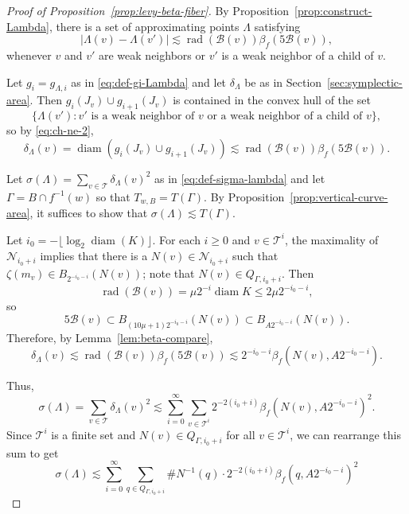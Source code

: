 \documentclass[12pt,reqno]{amsart}
\newcommand{\cB}{\mathcal{B}}
\newcommand{\cN}{\mathcal{N}}
\newcommand{\cT}{\mathcal{T}}
\DeclareMathOperator{\rad}{rad}
\theoremstyle{remark}
\newcommand{\0}{\mathbf{0}}
\renewcommand{\1}{\mathbf 1}
\DeclareMathOperator{\diam}{diam}
\begin{document}
\begin{proof}[Proof of Proposition~\ref{prop:levy-beta-fiber}]
  By Proposition~\ref{prop:construct-Lambda}, there is a set of approximating points $\Lambda$ satisfying
  \begin{equation}\label{eq:ch-ne-2}
    |\Lambda(v) - \Lambda(v')| \lesssim \rad(\cB(v)) \beta_f(5 \cB(v)),
  \end{equation}
  whenever $v$ and $v'$ are weak neighbors or $v'$ is a weak neighbor of a child of $v$.

  Let $g_i = g_{\Lambda,i}$ as in \eqref{eq:def-gi-Lambda} and let $\delta_\Lambda$ be as in Section~\ref{sec:symplectic-area}. Then $g_{i}(J_v) \cup g_{i+1}(J_v)$ is contained in the convex hull of the set
  $$\{\Lambda(v') : \text{$v'$ is a weak neighbor of $v$ or a weak neighbor of a child of $v$}\},$$
  so by \eqref{eq:ch-ne-2}, 
  $$\delta_\Lambda(v) = \diam\left(g_{i}(J_v) \cup g_{i+1}(J_v)\right) \lesssim \rad(\cB(v)) \beta_f(5 \cB(v)).$$

  Let $\sigma(\Lambda) = \sum_{v\in \cT} \delta_\Lambda(v)^2$ as in \eqref{eq:def-sigma-lambda} and let $\Gamma = B\cap f^{-1}(w)$ so that $T_{w,B}=T(\Gamma)$.
  By Proposition~\ref{prop:vertical-curve-area}, it suffices to show that $\sigma(\Lambda) \lesssim T(\Gamma)$.

  Let $i_0 = -\lfloor \log_2\diam(K)\rfloor$. For each $i\ge 0$ and $v\in \cT^i$, the maximality of $\cN_{i_0 + i}$ implies that there is a $N(v)\in \cN_{i_0+i}$ such that $\zeta(m_v) \in B_{2^{-i_0 - i}}(N(v))$; note that $N(v) \in Q_{\Gamma, i_0 + i}$. 
  Then 
  $$\rad(\cB(v)) = \mu 2^{-i}\diam K \le 2 \mu 2^{-i_0 - i},$$
  so
  \begin{equation}\label{eq:5cbv}
    5\cB(v) \subset B_{(10\mu + 1)2^{-i_0 - i}}(N(v)) \subset B_{A 2^{-i_0 - i}}(N(v)).
  \end{equation}
  Therefore, by Lemma~\ref{lem:beta-compare},
  $$\delta_\Lambda(v)\lesssim \rad(\cB(v)) \beta_f(5 \cB(v)) \lesssim 2^{-i_0 - i} \beta_f(N(v), A 2^{-i_0 - i}).$$
  
  Thus,
  $$
  \sigma(\Lambda) = \sum_{v\in \cT} \delta_\Lambda(v)^2 \lesssim \sum_{i=0}^\infty \sum_{v\in \cT^i} 2^{-2(i_0 + i)} \beta_f(N(v), A 2^{-i_0 - i})^2.
  $$
  Since $\cT^i$ is a finite set and $N(v) \in Q_{\Gamma, i_0 + i}$ for all $v\in \cT^i$, we can rearrange this sum to get
  \begin{equation}\label{eq:sigma-lambda-first}
    \sigma(\Lambda) \lesssim \sum_{i=0}^\infty \sum_{q\in Q_{\Gamma,i_0+i}} \#N^{-1}(q) \cdot 2^{-2(i_0 + i)} \beta_f(q, A 2^{-i_0 - i})^2 
  \end{equation}


\end{proof}
\end{document}
